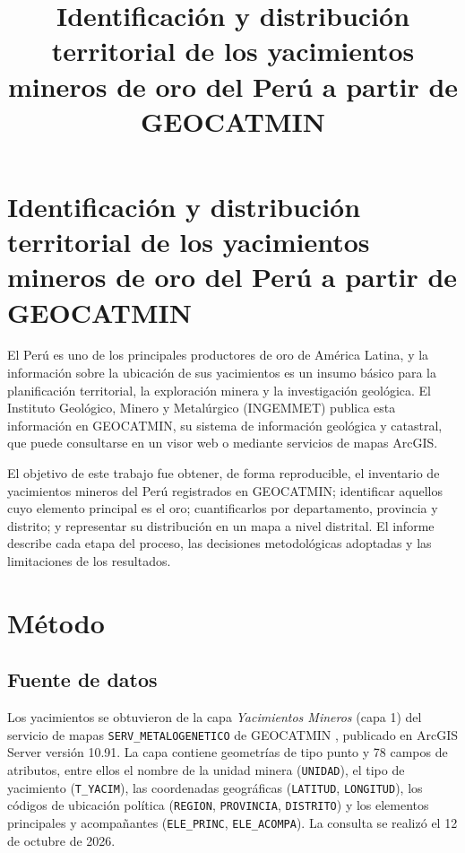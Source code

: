 \documentclass[man,12pt,a4paper,floatsintext,donotrepeattitle]{apa7}
\title{Identificación y distribución territorial de los yacimientos mineros de oro del Perú a partir de GEOCATMIN}
\begin{document}
\renewcommand{\keywordname}{Palabras clave}
\renewcommand{\acksname}{Nota del autor}
\hypersetup{hidelinks}
\maketitle

\section*{Identificación y distribución territorial de los yacimientos mineros de oro del Perú a partir de GEOCATMIN}

El Perú es uno de los principales productores de oro de América Latina, y la
información sobre la ubicación de sus yacimientos es un insumo básico para la
planificación territorial, la exploración minera y la investigación geológica.
El Instituto Geológico, Minero y Metalúrgico (INGEMMET) publica esta información
en GEOCATMIN, su sistema de información geológica y catastral, que puede
consultarse en un visor web o mediante servicios de mapas ArcGIS.

El objetivo de este trabajo fue obtener, de forma reproducible, el inventario de
yacimientos mineros del Perú registrados en GEOCATMIN; identificar aquellos cuyo
elemento principal es el oro; cuantificarlos por departamento, provincia y
distrito; y representar su distribución en un mapa a nivel distrital. El informe
describe cada etapa del proceso, las decisiones metodológicas adoptadas y las
limitaciones de los resultados.

\section{Método}

\subsection{Fuente de datos}

Los yacimientos se obtuvieron de la capa \textit{Yacimientos Mineros} (capa 1)
del servicio de mapas \texttt{SERV\_METALOGENETICO} de GEOCATMIN
\parencite{ingemmet2026}, publicado en ArcGIS Server versión 10.91. La capa
contiene geometrías de tipo punto y 78 campos de atributos, entre ellos el
nombre de la unidad minera (\texttt{UNIDAD}), el tipo de yacimiento
(\texttt{T\_YACIM}), las coordenadas geográficas (\texttt{LATITUD},
\texttt{LONGITUD}), los códigos de ubicación política (\texttt{REGION},
\texttt{PROVINCIA}, \texttt{DISTRITO}) y los elementos principales y
acompañantes (\texttt{ELE\_PRINC}, \texttt{ELE\_ACOMPA}). La consulta se realizó
el 12 de octubre de 2026.
\end{document}

